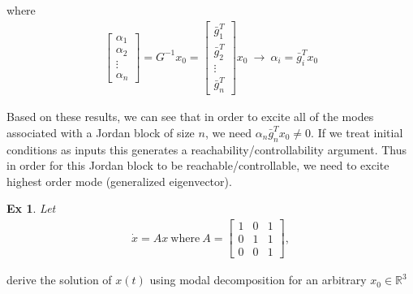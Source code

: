 \documentclass[twoside]{article}
\newtheorem{exmp}[theorem]{Ex}
\begin{document}
%
where 
\begin{align*}
\left[ \begin{array}{c} \alpha_1 \\ \alpha_2 \\ \vdots \\ \alpha_n \end{array} \right] = G^{-1} x_0 
= \left[ \begin{array}{c} \bar{g}_1^T \\ \bar{g}_2^T \\ \vdots \\ \bar{g}_n^T \end{array} \right] x_0 \ \rightarrow \ \alpha_i = \bar{g}_i^T x_0
\end{align*}

Based on these results, we can see that in order to excite all of the modes associated with a Jordan block of size $n$, 
we need $\alpha_n \bar{g}_n^T x_0 \neq 0$. If we treat initial conditions as inputs this generates a reachability/controllability argument. 
Thus in order for this Jordan block to be reachable/controllable, we need to excite highest order mode (generalized eigenvector).

\begin{exmp}
	Let 
\begin{align*}
\dot{x} = A x \ \mathrm{where} \  A = \left[ \begin{array}{ccc} 1 & 0 & 1 \\ 0 & 1 & 1 \\ 0 & 0 & 1
\end{array} \right] , 
\end{align*}
\end{exmp}
%
derive the solution of $x(t)$ using modal decomposition for an arbitrary $x_0 \in \mathbb{R}^3$ 
\end{document}
